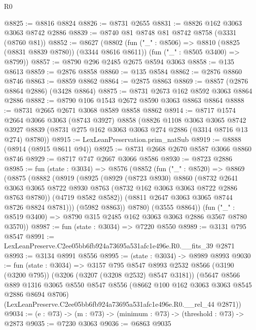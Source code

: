 \begin{lexlean}{R0}
\begin{coremodule}
@8825 := @8816 @8824
@8826 := @8731 @2655
@8831 := @8826 @162 @3063 @3063 @8742 @2886
@8839 := @8740 @81 @8748 @81 @8742 @8758 (@3331 (@8760 @81))
@8852 := @8627
    (@8802
      (fun ("_" : @8506) => @8810 (@8825 (@8831 @8839 @8780)) (@3344 @8616 @8611))
      (fun ("_" : @8505 @3400) => @8799))
@8857 := @8790 @296 @2485 @2675 @8594 @3063
@8858 := @135 @8613
@8859 := @2876 @8858
@8860 := @135 @8584
@8862 := @2876 @8860 @8746
@8863 := @8859 @8862
@8864 := @2875 @8863
@8869 := @8857 (@2876 @8864 @2886) (@3428 @8864)
@8875 := @8731 @2673 @162 @8592 @3063 @8864 @2886
@8882 := @8790 @106 @1543 @2672 @8590 @3063 @8863 @8864
@8888 := @8731 @2665 @2671 @3068 @8589 @8858 @8862
@8914 := @8717
    @1574
    @2664
    @3066
    @3063
    (@8743 @3927)
    @8858
    (@8826
      @1108
      @3063
      @3065
      @8742
      @3927
      @8839
      (@8731 @275 @162 @3063 @3063 @274 @2886 (@3314 @8716 @13 @274) @8780))
@8915 := LexLeanPreservation.prim_natSub
@8919 := @8888 (@8914 (@8915 @8611 @94))
@8925 := @8731 @2668 @2670 @8587 @3066 @8860 @8746
@8929 := @8717 @747 @2667 @3066 @8586
@8930 := @8723 @2886
@8985 := fun (state : @3034) =>
  @8576
    (@8852
      (fun ("_" : @8520) =>
      @8869
        (@8875
          (@8882
            (@8919
              (@8925
                (@8929
                  (@8723 @8930)
                  @8860
                  (@8732
                    @2641
                    @3063
                    @3065
                    @8722
                    @8930
                    @8763
                    (@8732 @162 @3063 @3063 @8722 @2886 @8763 @8780))
                  (@4719 @8582 @8582))
                (@8811 @2647 @3063 @3065 @8744 @8726 @8824 @8781)))
            (@5982 @8863))
          @8780)
        (@3555 @8864))
      (fun ("_" : @8519 @3400) => @8790 @315 @2485 @162 @3063 @3063 @2886 @3567 @8780 @3570))
@8987 := fun (state : @3034) => @7220 @8550
@8989 := @3131 @795 @8547
@8991 := LexLeanPreserve.C2ee05bb6fb924a73695a531afc1e496e.R0.__fits_39 @2871
@8993 := @3134 @8991 @8556
@8995 := (state : @3034) -> @8989 @8993
@9030 := fun (state : @3034) =>
  @3157
    @795
    @8547
    @8993
    @2532
    @8566
    (@3190 (@3200 @795))
    (@3206 (@3207 (@3208 @2532) @8547 @3181))
    (@5647
      @8566
      @889
      @1316
      @3065
      @8550
      @8547
      @8556
      (@8662 @100 @162 @3063 @3063 @8545 @2886 @8694 @8706)
      (LexLeanPreserve.C2ee05bb6fb924a73695a531afc1e496e.R0.__rel_44 @2871))
@9034 := (e : @73) -> (m : @73) -> (minimum : @73) -> (threshold : @73) -> @2873
@9035 := @7230 @3063
@9036 := @6863 @9035

\end{coremodule}
\end{lexlean}
